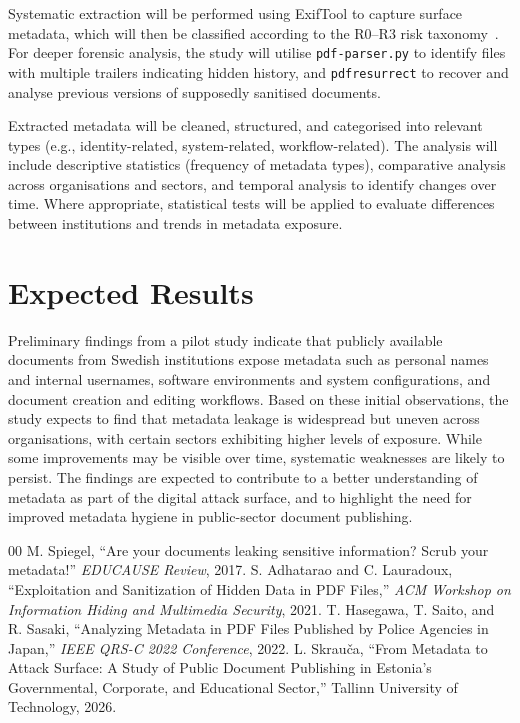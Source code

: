 \documentclass[conference]{IEEEtran}
\begin{document}
Systematic extraction will be performed using ExifTool to capture surface metadata, which will then be classified according to the R0--R3 risk taxonomy~\cite{b4}. For deeper forensic analysis, the study will utilise \texttt{pdf-parser.py} to identify files with multiple trailers indicating hidden history, and \texttt{pdfresurrect} to recover and analyse previous versions of supposedly sanitised documents.

Extracted metadata will be cleaned, structured, and categorised into relevant types (e.g., identity-related, system-related, workflow-related). The analysis will include descriptive statistics (frequency of metadata types), comparative analysis across organisations and sectors, and temporal analysis to identify changes over time. Where appropriate, statistical tests will be applied to evaluate differences between institutions and trends in metadata exposure.

\section{Expected Results}

Preliminary findings from a pilot study indicate that publicly available documents from Swedish institutions expose metadata such as personal names and internal usernames, software environments and system configurations, and document creation and editing workflows. Based on these initial observations, the study expects to find that metadata leakage is widespread but uneven across organisations, with certain sectors exhibiting higher levels of exposure. While some improvements may be visible over time, systematic weaknesses are likely to persist. The findings are expected to contribute to a better understanding of metadata as part of the digital attack surface, and to highlight the need for improved metadata hygiene in public-sector document publishing.

\begin{thebibliography}{00}
 M. Spiegel, ``Are your documents leaking sensitive information? Scrub your metadata!'' \textit{EDUCAUSE Review}, 2017.
 S. Adhatarao and C. Lauradoux, ``Exploitation and Sanitization of Hidden Data in PDF Files,'' \textit{ACM Workshop on Information Hiding and Multimedia Security}, 2021.
 T. Hasegawa, T. Saito, and R. Sasaki, ``Analyzing Metadata in PDF Files Published by Police Agencies in Japan,'' \textit{IEEE QRS-C 2022 Conference}, 2022.
 L. Skrau\v{c}a, ``From Metadata to Attack Surface: A Study of Public Document Publishing in Estonia's Governmental, Corporate, and Educational Sector,'' Tallinn University of Technology, 2026.
\end{thebibliography}
\end{document}
